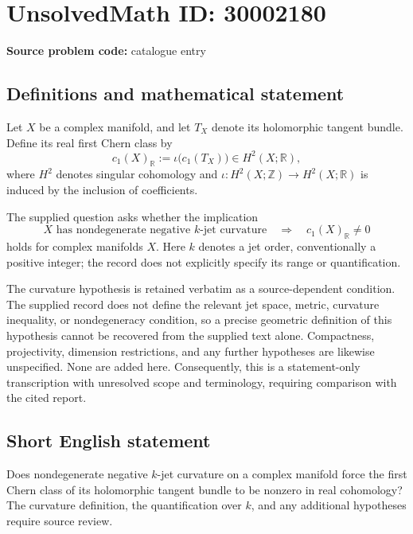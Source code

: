 \documentclass[11pt]{article}
\newcommand{\Z}{\mathbb{Z}}
\newcommand{\R}{\mathbb{R}}
\begin{document}
\section*{UnsolvedMath ID: 30002180}
\textbf{Source problem code:} catalogue entry
\subsection{Definitions and mathematical statement}
Let \(X\) be a complex manifold, and let \(T_X\) denote its holomorphic tangent bundle. Define its real first Chern class by
\[
c_1(X)_{\R}:=\iota\bigl(c_1(T_X)\bigr)\in H^2(X;\R),
\]
where \(H^2\) denotes singular cohomology and \(\iota:H^2(X;\Z)\to H^2(X;\R)\) is induced by the inclusion of coefficients.

The supplied question asks whether the implication
\[
X\text{ has nondegenerate negative }k\text{-jet curvature}
\quad\Longrightarrow\quad
c_1(X)_{\R}\ne 0
\]
holds for complex manifolds \(X\). Here \(k\) denotes a jet order, conventionally a positive integer; the record does not explicitly specify its range or quantification.

The curvature hypothesis is retained verbatim as a source-dependent condition. The supplied record does not define the relevant jet space, metric, curvature inequality, or nondegeneracy condition, so a precise geometric definition of this hypothesis cannot be recovered from the supplied text alone. Compactness, projectivity, dimension restrictions, and any further hypotheses are likewise unspecified. None are added here. Consequently, this is a statement-only transcription with unresolved scope and terminology, requiring comparison with the cited report.
\subsection{Short English statement}
Does nondegenerate negative \(k\)-jet curvature on a complex manifold force the first Chern class of its holomorphic tangent bundle to be nonzero in real cohomology? The curvature definition, the quantification over \(k\), and any additional hypotheses require source review.
\end{document}
